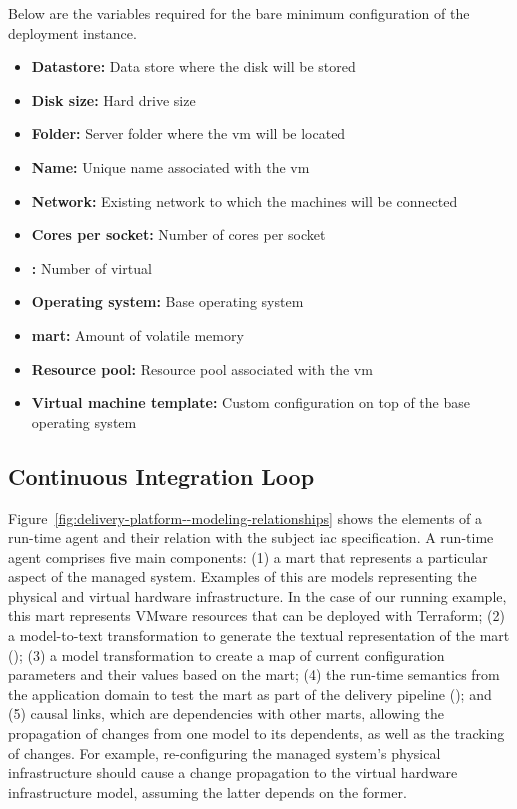 Below are the variables required for the bare minimum configuration of the deployment instance.

\begin{itemize}[noitemsep]
	\item \textbf{Datastore:} Data store where the disk will be stored
	\item \textbf{Disk size:} Hard drive size
	\item \textbf{Folder:} Server folder where the \gls{vm} will be located
	\item \textbf{Name:} Unique name associated with the \gls{vm}
	\item \textbf{Network:} Existing network to which the machines will be connected
	\item \textbf{Cores per socket:} Number of cores per socket
	\item \textbf{:} Number of virtual 
	\item \textbf{Operating system:} Base operating system
	\item \textbf{\acrshort{mart}:} Amount of volatile memory
	\item \textbf{Resource pool:} Resource pool associated with the \gls{vm}
	\item \textbf{Virtual machine template:} Custom configuration on top of the base operating system
\end{itemize}

\subsection{Continuous Integration Loop}
\label{subsect:delivery-platform--ci-loop}

Figure~\ref{fig:delivery-platform--modeling-relationships} shows the elements of a run-time agent and their relation with the subject \gls{iac} specification. A run-time agent comprises five main components: (1) a \gls{mart} that represents a particular aspect of the managed system. Examples of this are models representing the physical and virtual hardware infrastructure. In the case of our running example, this \gls{mart} represents VMware resources that can be deployed with Terraform; (2) a model-to-text transformation to generate the textual representation of the \gls{mart} (); (3) a model transformation to create a map of current configuration parameters and their values based on the \gls{mart}; (4) the run-time semantics from the application domain to test the \gls{mart} as part of the delivery pipeline (); and (5) causal links, which are dependencies with other \glspl{mart}, allowing the propagation of changes from one model to its dependents, as well as the tracking of changes. For example, re-configuring the managed system's physical infrastructure should cause a change propagation to the virtual hardware infrastructure model, assuming the latter depends on the former.

